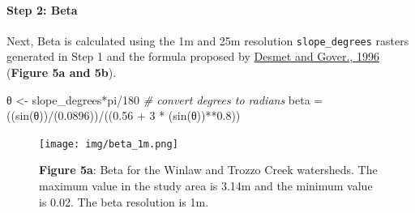 \documentclass[
]{article}
\newenvironment{Shaded}{\begin{snugshade}}{\end{snugshade}}
\newcommand{\CommentTok}[1]{\textcolor[rgb]{0.56,0.35,0.01}{\textit{#1}}}
\newcommand{\DecValTok}[1]{\textcolor[rgb]{0.00,0.00,0.81}{#1}}
\newcommand{\FloatTok}[1]{\textcolor[rgb]{0.00,0.00,0.81}{#1}}
\newcommand{\FunctionTok}[1]{\textcolor[rgb]{0.00,0.00,0.00}{#1}}
\newcommand{\NormalTok}[1]{#1}
\newcommand{\OtherTok}[1]{\textcolor[rgb]{0.56,0.35,0.01}{#1}}
\newcommand{\SpecialCharTok}[1]{\textcolor[rgb]{0.00,0.00,0.00}{#1}}
\begin{document}
\hypertarget{sec-step-2-ls}{%
\paragraph*{Step 2: Beta}\label{sec-step-2-ls}}

Next, Beta is calculated using the 1m and 25m resolution \texttt{slope\_degrees} rasters generated in Step 1 and the formula proposed by \href{https://www.researchgate.net/publication/233425999_A_GIS_procedure_for_automatically_calculating_the_USLE_LS_factor_on_topographically_complex_landscape_units}{Desmet and Gover., 1996} (\textbf{Figure 5a and 5b}).

\begin{Shaded}
\begin{Highlighting}[]
\NormalTok{θ }\OtherTok{\textless{}{-}}\NormalTok{ slope\_degrees}\SpecialCharTok{*}\NormalTok{pi}\SpecialCharTok{/}\DecValTok{180} \CommentTok{\# convert degrees to radians}
\NormalTok{beta }\OtherTok{=}\NormalTok{ ((}\FunctionTok{sin}\NormalTok{(θ))}\SpecialCharTok{/}\NormalTok{(}\FloatTok{0.0896}\NormalTok{))}\SpecialCharTok{/}\NormalTok{((}\FloatTok{0.56} \SpecialCharTok{+} \DecValTok{3} \SpecialCharTok{*}\NormalTok{ (}\FunctionTok{sin}\NormalTok{(θ))}\SpecialCharTok{**}\FloatTok{0.8}\NormalTok{))}
\end{Highlighting}
\end{Shaded}

\begin{figure}
\centering
\texttt{[image: img/beta\_1m.png]}
\caption{\textbf{Figure 5a}: Beta for the Winlaw and Trozzo Creek watersheds. The maximum value in the study area is 3.14m and the minimum value is 0.02. The beta resolution is 1m.}
\end{figure}
\end{document}
